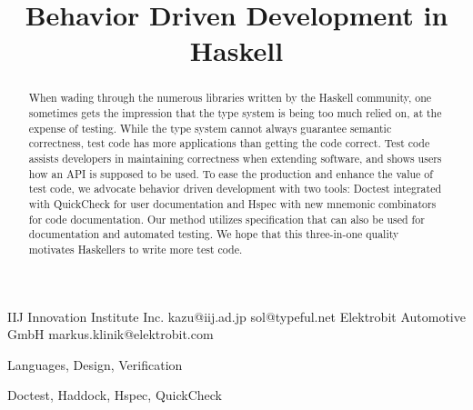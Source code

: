 \documentclass[preprint]{sigplanconf}
\begin{document}
\copyrightdata{[to be supplied]}


\title{Behavior Driven Development in Haskell}

           {IIJ Innovation Institute Inc.}
           {kazu@iij.ad.jp}
           {}
           {sol@typeful.net}
           {Elektrobit Automotive GmbH}
           {markus.klinik@elektrobit.com}

\maketitle

\begin{abstract}

When wading through the numerous libraries written by
the Haskell community, one sometimes gets the impression that the type
system is being too much relied on, at the expense of testing.
While the type system cannot always guarantee semantic correctness,
test code has more applications than getting the code correct.
Test code assists developers in maintaining correctness when extending
software, and shows users how an API is supposed to be used.
To ease the production and enhance the value of test code, we advocate
behavior driven development with two tools:
Doctest integrated with QuickCheck for user documentation and
Hspec with new mnemonic combinators for code documentation.
Our method utilizes specification that can also be used for
documentation and automated testing. We hope that this three-in-one
quality motivates Haskellers to write more test code.


\end{abstract}


\terms Languages, Design, Verification

\keywords Doctest, Haddock, Hspec, QuickCheck

\end{document}
